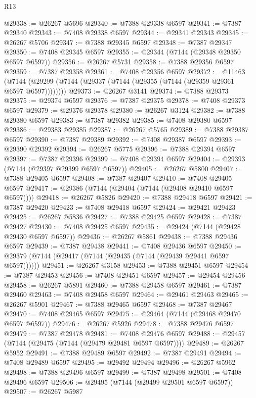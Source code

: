 \begin{lexlean}{R13}
\begin{coremodule}
@29338 := @26267 @5696
@29340 := @7388 @29338 @6597
@29341 := @7387 @29340
@29343 := @7408 @29338 @6597
@29344 := @29341 @29343
@29345 := @26267 @5706
@29347 := @7388 @29345 @6597
@29348 := @7387 @29347
@29350 := @7408 @29345 @6597
@29355 := @29344 (@7144 (@29348 @29350 @6597 @6597))
@29356 := @26267 @5731
@29358 := @7388 @29356 @6597
@29359 := @7387 @29358
@29361 := @7408 @29356 @6597
@29372 := @11463
    (@7144 (@29299 (@7144 (@29337 (@7144 (@29355 (@7144 (@29359 @29361 @6597 @6597))))))))
@29373 := @26267 @3141
@29374 := @7388 @29373
@29375 := @29374 @6597
@29376 := @7387 @29375
@29378 := @7408 @29373 @6597
@29379 := @29376 @29378
@29380 := @26267 @3124
@29382 := @7388 @29380 @6597
@29383 := @7387 @29382
@29385 := @7408 @29380 @6597
@29386 := @29383 @29385
@29387 := @26267 @5765
@29389 := @7388 @29387 @6597
@29390 := @7387 @29389
@29392 := @7408 @29387 @6597
@29393 := @29390 @29392
@29394 := @26267 @5775
@29396 := @7388 @29394 @6597
@29397 := @7387 @29396
@29399 := @7408 @29394 @6597
@29404 := @29393 (@7144 (@29397 @29399 @6597 @6597))
@29405 := @26267 @5800
@29407 := @7388 @29405 @6597
@29408 := @7387 @29407
@29410 := @7408 @29405 @6597
@29417 := @29386 (@7144 (@29404 (@7144 (@29408 @29410 @6597 @6597))))
@29418 := @26267 @5826
@29420 := @7388 @29418 @6597
@29421 := @7387 @29420
@29423 := @7408 @29418 @6597
@29424 := @29421 @29423
@29425 := @26267 @5836
@29427 := @7388 @29425 @6597
@29428 := @7387 @29427
@29430 := @7408 @29425 @6597
@29435 := @29424 (@7144 (@29428 @29430 @6597 @6597))
@29436 := @26267 @5861
@29438 := @7388 @29436 @6597
@29439 := @7387 @29438
@29441 := @7408 @29436 @6597
@29450 := @29379 (@7144 (@29417 (@7144 (@29435 (@7144 (@29439 @29441 @6597 @6597))))))
@29451 := @26267 @3158
@29453 := @7388 @29451 @6597
@29454 := @7387 @29453
@29456 := @7408 @29451 @6597
@29457 := @29454 @29456
@29458 := @26267 @5891
@29460 := @7388 @29458 @6597
@29461 := @7387 @29460
@29463 := @7408 @29458 @6597
@29464 := @29461 @29463
@29465 := @26267 @5901
@29467 := @7388 @29465 @6597
@29468 := @7387 @29467
@29470 := @7408 @29465 @6597
@29475 := @29464 (@7144 (@29468 @29470 @6597 @6597))
@29476 := @26267 @5926
@29478 := @7388 @29476 @6597
@29479 := @7387 @29478
@29481 := @7408 @29476 @6597
@29488 := @29457 (@7144 (@29475 (@7144 (@29479 @29481 @6597 @6597))))
@29489 := @26267 @5952
@29491 := @7388 @29489 @6597
@29492 := @7387 @29491
@29494 := @7408 @29489 @6597
@29495 := @29492 @29494
@29496 := @26267 @5962
@29498 := @7388 @29496 @6597
@29499 := @7387 @29498
@29501 := @7408 @29496 @6597
@29506 := @29495 (@7144 (@29499 @29501 @6597 @6597))
@29507 := @26267 @5987

\end{coremodule}
\end{lexlean}
